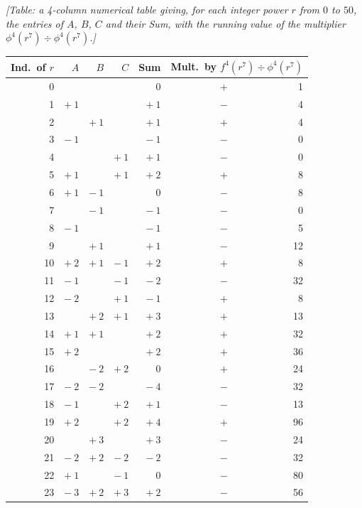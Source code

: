 \documentclass[11pt]{article}
\begin{document}
\noindent\textit{[Table: a 4-column numerical table giving, for each integer power $r$ from
$0$ to $50$, the entries of $A$, $B$, $C$ and their Sum, with the running value of the
multiplier $\phi^4(r^7)\div\phi^4(r^7)$.]}
\begin{center}
\renewcommand{\arraystretch}{1.02}
\begin{tabular}{rrrrrrr}
\hline
Ind.\ of $r$ & $A$ & $B$ & $C$ & Sum & \multicolumn{2}{c}{Mult.\ by $f^4(r^7)\div\phi^4(r^7)$}\\
\hline
0  &       &       &     & 0   & + & 1 \\
1  & $+\ 1$ &       &     & $+\ 1$ & $-$ & 4 \\
2  &       & $+\ 1$ &     & $+\ 1$ & $+$ & 4 \\
3  & $-\ 1$ &       &     & $-\ 1$ & $-$ & 0 \\
4  &       &       & $+\ 1$ & $+\ 1$ & $-$ & 0 \\
5  & $+\ 1$ &       & $+\ 1$ & $+\ 2$ & $+$ & 8 \\
6  & $+\ 1$ & $-\ 1$ &     & $0$ & $-$ & 8 \\
7  &       & $-\ 1$ &     & $-\ 1$ & $-$ & 0 \\
8  & $-\ 1$ &       &     & $-\ 1$ & $-$ & 5 \\
9  &       & $+\ 1$ &     & $+\ 1$ & $-$ & 12 \\
10 & $+\ 2$ & $+\ 1$ & $-\ 1$ & $+\ 2$ & $+$ & 8 \\
11 & $-\ 1$ &       & $-\ 1$ & $-\ 2$ & $-$ & 32 \\
12 & $-\ 2$ &       & $+\ 1$ & $-\ 1$ & $+$ & 8 \\
13 &       & $+\ 2$ & $+\ 1$ & $+\ 3$ & $+$ & 13 \\
14 & $+\ 1$ & $+\ 1$ &       & $+\ 2$ & $+$ & 32 \\
15 & $+\ 2$ &       &       & $+\ 2$ & $+$ & 36 \\
16 &       & $-\ 2$ & $+\ 2$ & $0$ & $+$ & 24 \\
17 & $-\ 2$ & $-\ 2$ &       & $-\ 4$ & $-$ & 32 \\
18 & $-\ 1$ &       & $+\ 2$ & $+\ 1$ & $-$ & 13 \\
19 & $+\ 2$ &       & $+\ 2$ & $+\ 4$ & $+$ & 96 \\
20 &       & $+\ 3$ &       & $+\ 3$ & $-$ & 24 \\
21 & $-\ 2$ & $+\ 2$ & $-\ 2$ & $-\ 2$ & $-$ & 32 \\
22 & $+\ 1$ &       & $-\ 1$ & $0$ & $-$ & 80 \\
23 & $-\ 3$ & $+\ 2$ & $+\ 3$ & $+\ 2$ & $-$ & 56 \\

\end{tabular}
\end{center}
\end{document}
